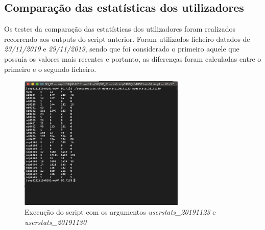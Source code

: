 \documentclass[10pt,portuguese]{article}
\begin{document}
\subsection{Comparação das estatísticas dos utilizadores}
Os testes da comparação das estatísticas dos utilizadores foram realizados recorrendo aos outputs do script anterior. Foram utilizados ficheiro datados de \textit{23/11/2019} e \textit{29/11/2019}, sendo que foi considerado o primeiro aquele que possuía os valores mais recentes e portanto, as diferenças foram calculadas entre o primeiro e o segundo ficheiro.
\begin{figure}[!h]
    \centering
    \includegraphics[width=300]{Resultados/normal_c.png}
    \caption{Execução do script com os argumentos \textit{userstats\_20191123} e \textit{userstats\_20191130}}
\end{figure}
\end{document}
